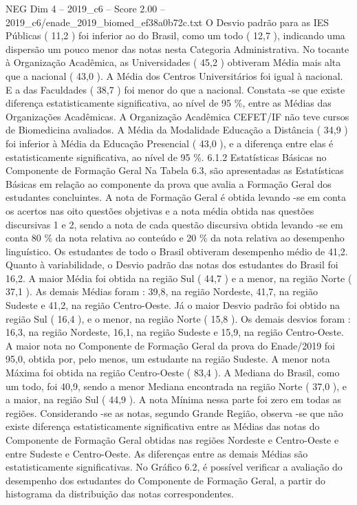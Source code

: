 \begin{textsample}{NEG Dim 4 – 2019\_c6 – Score 2.00 – 2019\_c6/enade\_2019\_biomed\_ef38a0b72c.txt}
O Desvio padrão para as IES Públicas ( 11,2 ) foi inferior ao do Brasil, como um todo ( 12,7 ), indicando uma dispersão um pouco menor das notas nesta Categoria Administrativa.
No tocante à Organização Acadêmica, as Universidades ( 45,2 ) obtiveram Média mais alta que a nacional ( 43,0 ).
A Média dos Centros Universitários foi igual à nacional.
E a das Faculdades ( 38,7 ) foi menor do que a nacional.
Constata -se que existe diferença estatisticamente significativa, ao nível de 95 \%, entre as Médias das Organizações Acadêmicas.
A Organização Acadêmica CEFET/IF não teve cursos de Biomedicina avaliados.
A Média da Modalidade Educação a Distância ( 34,9 ) foi inferior à Média da Educação Presencial ( 43,0 ), e a diferença entre elas é estatisticamente significativa, ao nível de 95 \%. 6.1.2 Estatísticas Básicas no Componente de Formação Geral Na Tabela 6.3, são apresentadas as Estatísticas Básicas em relação ao componente da prova que avalia a Formação Geral dos estudantes concluintes.
A nota de Formação Geral é obtida levando -se em conta os acertos nas oito questões objetivas e a nota média obtida nas questões discursivas 1 e 2, sendo a nota de cada questão discursiva obtida levando -se em conta 80 \% da nota relativa ao conteúdo e 20 \% da nota relativa ao desempenho linguístico.
Os estudantes de todo o Brasil obtiveram desempenho médio de 41,2.
Quanto à variabilidade, o Desvio padrão das notas dos estudantes do Brasil foi 16,2.
A maior Média foi obtida na região Sul ( 44,7 ) e a menor, na região Norte ( 37,1 ).
As demais Médias foram : 39,8, na região Nordeste, 41,7, na região Sudeste e 41,2, na região Centro-Oeste.
Já o maior Desvio padrão foi obtido na região Sul ( 16,4 ), e o menor, na região Norte ( 15,8 ).
Os demais desvios foram : 16,3, na região Nordeste, 16,1, na região Sudeste e 15,9, na região Centro-Oeste.
A maior nota no Componente de Formação Geral da prova do Enade/2019 foi 95,0, obtida por, pelo menos, um estudante na região Sudeste.
A menor nota Máxima foi obtida na região Centro-Oeste ( 83,4 ).
A Mediana do Brasil, como um todo, foi 40,9, sendo a menor Mediana encontrada na região Norte ( 37,0 ), e a maior, na região Sul ( 44,9 ).
A nota Mínima nessa parte foi zero em todas as regiões.
Considerando -se as notas, segundo Grande Região, observa -se que não existe diferença estatisticamente significativa entre as Médias das notas do Componente de Formação Geral obtidas nas regiões Nordeste e Centro-Oeste e entre Sudeste e Centro-Oeste.
As diferenças entre as demais Médias são estatisticamente significativas.
No Gráfico 6.2, é possível verificar a avaliação do desempenho dos estudantes do Componente de Formação Geral, a partir do histograma da distribuição das notas correspondentes.

\end{textsample}
